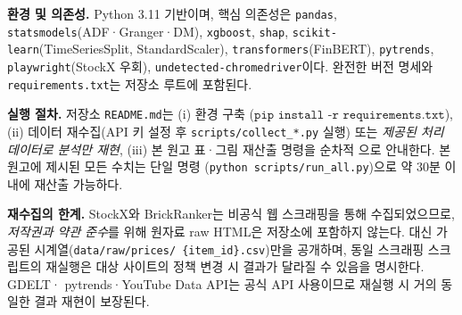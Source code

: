 \documentclass[11pt, a4paper, twocolumn]{article}
\begin{document}
\textbf{환경 및 의존성.} Python 3.11 기반이며, 핵심 의존성은
\texttt{pandas}, \texttt{statsmodels}(ADF·Granger·DM),
\texttt{xgboost}, \texttt{shap}, \texttt{scikit-learn}(TimeSeriesSplit,
StandardScaler), \texttt{transformers}(FinBERT), \texttt{pytrends},
\texttt{playwright}(StockX 우회), \texttt{undetected-chromedriver}이다.
완전한 버전 명세와 \texttt{requirements.txt}는 저장소 루트에 포함된다.

\textbf{실행 절차.} 저장소 \texttt{README.md}는 (i) 환경 구축
($\texttt{pip install -r requirements.txt}$), (ii) 데이터 재수집(API 키
설정 후 \texttt{scripts/collect\_*.py} 실행) 또는 \emph{제공된 처리
데이터로 분석만 재현}, (iii) 본 원고 표·그림 재산출 명령을 순차적
으로 안내한다. 본 원고에 제시된 모든 수치는 단일 명령
(\texttt{python scripts/run\_all.py})으로 약 30분 이내에 재산출
가능하다.

\textbf{재수집의 한계.} StockX와 BrickRanker는 비공식 웹 스크래핑을
통해 수집되었으므로, \emph{저작권과 약관 준수}를 위해 원자료 raw HTML은
저장소에 포함하지 않는다. 대신 가공된 시계열(\texttt{data/raw/prices/
\{item\_id\}.csv})만을 공개하며, 동일 스크래핑 스크립트의 재실행은
대상 사이트의 정책 변경 시 결과가 달라질 수 있음을 명시한다. GDELT·
pytrends·YouTube Data API는 공식 API 사용이므로 재실행 시 거의 동일한
결과 재현이 보장된다.
\end{document}
